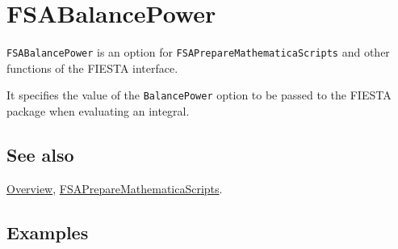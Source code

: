 \documentclass[../FeynHelpersManual.tex]{subfiles}
\begin{document}
\begin{Shaded}
\begin{Highlighting}[]
 
\end{Highlighting}
\end{Shaded}

\hypertarget{fsabalancepower}{
\section{FSABalancePower}\label{fsabalancepower}}

\texttt{FSABalancePower} is an option for
\texttt{FSAPrepareMathematicaScripts} and other functions of the FIESTA
interface.

It specifies the value of the \texttt{BalancePower} option to be passed
to the FIESTA package when evaluating an integral.

\subsection{See also}

\hyperlink{toc}{Overview},
\hyperlink{fsapreparemathematicascripts}{FSAPrepareMathematicaScripts}.

\subsection{Examples}
\end{document}
